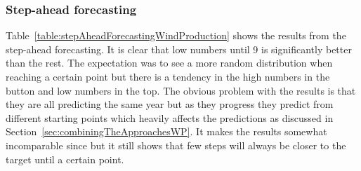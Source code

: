 \subsubsection{Step-ahead forecasting}
Table~\ref{table:stepAheadForecastingWindProduction} shows the results from the step-ahead forecasting. It is clear that low numbers until 9 is significantly better than the rest. The expectation was to see a more random distribution when reaching a certain point but there is a tendency in the high numbers in the button and low numbers in the top. The obvious problem with the results is that they are all predicting the same year but as they progress they predict from different starting points which heavily affects the predictions as discussed in Section~\ref{sec:combiningTheApproachesWP}. It makes the results somewhat incomparable since but it still shows that few steps will always be closer to the target until a certain point.

